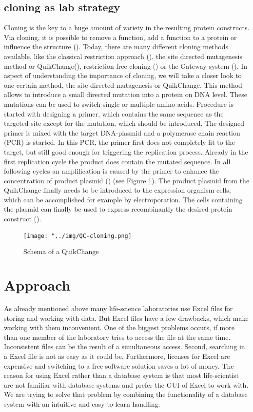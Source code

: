 \documentclass{bioinfo}
\begin{document}
\subsection{cloning as lab strategy}
Cloning is the key to a huge amount of variety in the resulting protein constructs. Via cloning, it 
is possible to remove a function, add a function to a protein or influence the structure (\citealp{Clark1}). 
Today, there are many different cloning methods available, like the classical restriction approach 
(\citealp{Clark1}), the site directed mutagenesis method or QuikChange\textregistered (\citealp{Quik}), 
restriction free cloning (\citealp{VanDenEnt}) or the Gateway system (\citealp{Clark1}). In aspect 
of understanding the importance of cloning, we will take a closer look to one certain method, the 
site directed mutagenesis or QuikChange\textregistered. This method allows to introduce a small 
directed mutation into a protein on DNA level. These mutations can be used to switch single or 
multiple amino acids. Procedure is started with designing a primer, which contains the same sequence 
as the targeted site except for the mutation, which should be introduced. The designed primer is 
mixed with the target DNA-plasmid and a polymerase chain reaction (PCR) is started. In this PCR, the 
primer first does not completely fit to the target, but still good enough for triggering the replication 
process. Already in the first replication cycle the product does contain the mutated sequence. In 
all following cycles an amplification is caused by the primer to enhance the concentration of 
product plasmid (\citealp{Quik}) (see Figure \ref{QC-pic}). The product plasmid from the QuikChange\textregistered 
finally needs to be introduced to the expression organism cells, which can be accomplished for example 
by electroporation. The cells containing the plasmid can finally be used to express recombinantly 
the desired protein construct (\citealp{Mülhardt1}).

\begin{figure}
	\texttt{[image: "../img/QC-cloning.png]}
	\caption{Schema of a QuikChange\textregistered  }
	\label{QC-pic}
\end{figure}

\section{Approach}
As already mentioned above many life-science laboratories use Excel files for storing and working with 
data. But Excel files have a few drawbacks, which make working with them inconvenient. One of the 
biggest problems occurs, if more than one member of the laboratory tries to access the file at the 
same time. Inconsistent files can be the result of a simultaneous access. Second, searching in a Excel file is not as easy as 
it could be. Furthermore, licenses for Excel are expensive and switching to a free software solution 
saves a lot of money. The reason for using Excel rather than a database system is that most life-scientist 
are not familiar with database systems and prefer the GUI of Excel to work with. We are 
trying to solve that problem by combining the functionality of a database system with an intuitive and 
easy-to-learn handling.
\end{document}

